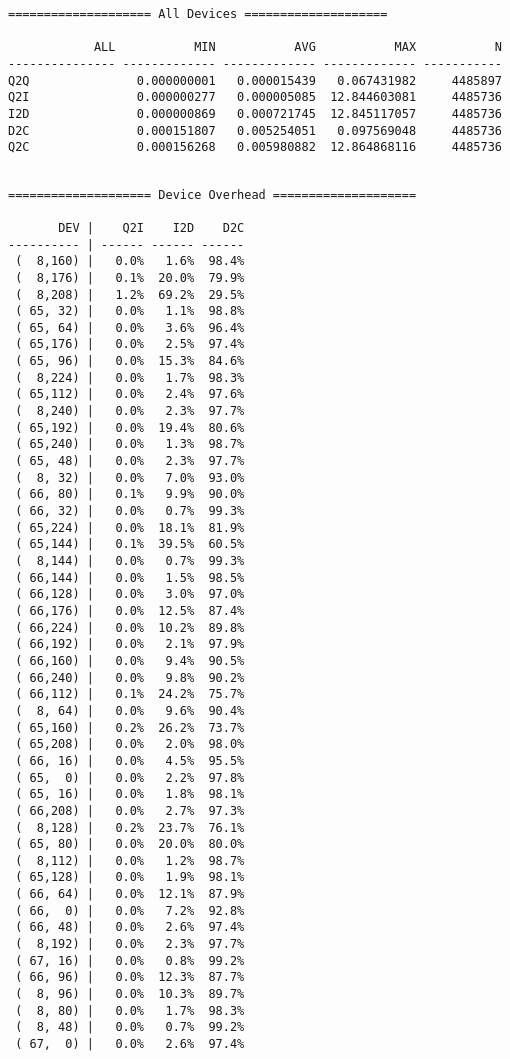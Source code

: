 \documentclass{article}
\begin{document}
\begin{verbatim}
==================== All Devices ====================

            ALL           MIN           AVG           MAX           N
--------------- ------------- ------------- ------------- -----------
Q2Q               0.000000001   0.000015439   0.067431982     4485897
Q2I               0.000000277   0.000005085  12.844603081     4485736
I2D               0.000000869   0.000721745  12.845117057     4485736
D2C               0.000151807   0.005254051   0.097569048     4485736
Q2C               0.000156268   0.005980882  12.864868116     4485736

\end{verbatim}
\newpage\begin{verbatim}

==================== Device Overhead ====================

       DEV |    Q2I    I2D    D2C
---------- | ------ ------ ------
 (  8,160) |   0.0%   1.6%  98.4%
 (  8,176) |   0.1%  20.0%  79.9%
 (  8,208) |   1.2%  69.2%  29.5%
 ( 65, 32) |   0.0%   1.1%  98.8%
 ( 65, 64) |   0.0%   3.6%  96.4%
 ( 65,176) |   0.0%   2.5%  97.4%
 ( 65, 96) |   0.0%  15.3%  84.6%
 (  8,224) |   0.0%   1.7%  98.3%
 ( 65,112) |   0.0%   2.4%  97.6%
 (  8,240) |   0.0%   2.3%  97.7%
 ( 65,192) |   0.0%  19.4%  80.6%
 ( 65,240) |   0.0%   1.3%  98.7%
 ( 65, 48) |   0.0%   2.3%  97.7%
 (  8, 32) |   0.0%   7.0%  93.0%
 ( 66, 80) |   0.1%   9.9%  90.0%
 ( 66, 32) |   0.0%   0.7%  99.3%
 ( 65,224) |   0.0%  18.1%  81.9%
 ( 65,144) |   0.1%  39.5%  60.5%
 (  8,144) |   0.0%   0.7%  99.3%
 ( 66,144) |   0.0%   1.5%  98.5%
 ( 66,128) |   0.0%   3.0%  97.0%
 ( 66,176) |   0.0%  12.5%  87.4%
 ( 66,224) |   0.0%  10.2%  89.8%
 ( 66,192) |   0.0%   2.1%  97.9%
 ( 66,160) |   0.0%   9.4%  90.5%
 ( 66,240) |   0.0%   9.8%  90.2%
 ( 66,112) |   0.1%  24.2%  75.7%
 (  8, 64) |   0.0%   9.6%  90.4%
 ( 65,160) |   0.2%  26.2%  73.7%
 ( 65,208) |   0.0%   2.0%  98.0%
 ( 66, 16) |   0.0%   4.5%  95.5%
 ( 65,  0) |   0.0%   2.2%  97.8%
 ( 65, 16) |   0.0%   1.8%  98.1%
 ( 66,208) |   0.0%   2.7%  97.3%
 (  8,128) |   0.2%  23.7%  76.1%
 ( 65, 80) |   0.0%  20.0%  80.0%
 (  8,112) |   0.0%   1.2%  98.7%
 ( 65,128) |   0.0%   1.9%  98.1%
 ( 66, 64) |   0.0%  12.1%  87.9%
 ( 66,  0) |   0.0%   7.2%  92.8%
 ( 66, 48) |   0.0%   2.6%  97.4%
 (  8,192) |   0.0%   2.3%  97.7%
 ( 67, 16) |   0.0%   0.8%  99.2%
 ( 66, 96) |   0.0%  12.3%  87.7%
 (  8, 96) |   0.0%  10.3%  89.7%
 (  8, 80) |   0.0%   1.7%  98.3%
 (  8, 48) |   0.0%   0.7%  99.2%
 ( 67,  0) |   0.0%   2.6%  97.4%

\end{verbatim}
\end{document}
